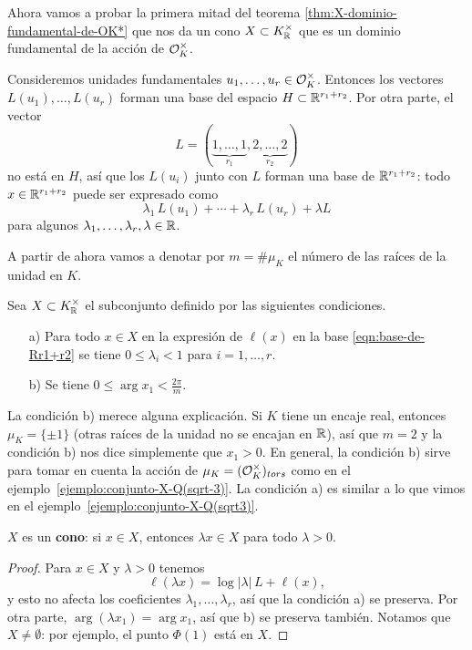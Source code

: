 Ahora vamos a probar la primera mitad del teorema
\ref{thm:X-dominio-fundamental-de-OK*} que nos da un cono
$X \subset K_{\mathbb{R}}^\times$ que es un dominio fundamental de la acción
de $\mathcal{O}_K^\times$.

Consideremos unidades fundamentales $u_1, \ldots, u_r \in \mathcal{O}_K^\times$. Entonces
los vectores $L (u_1), \ldots, L (u_r)$ forman una base del espacio $H \subset
\mathbb{R}^{r_1+r_2}$. Por otra parte, el vector
$$L = (\underbrace{1,\ldots,1}_{r_1}, \underbrace{2,\ldots,2}_{r_2})$$
no está en $H$, así que los $L (u_i)$ junto con $L$ forman una base de
$\mathbb{R}^{r_1+r_2}$: todo $x \in \mathbb{R}^{r_1+r_2}$ puede ser expresado como
\begin{equation}
  \label{eqn:base-de-Rr1+r2}
  \lambda_1 \, L (u_1) + \cdots + \lambda_r \, L (u_r) + \lambda L
\end{equation}
para algunos $\lambda_1,\ldots,\lambda_r,\lambda \in \mathbb{R}$.

A partir de ahora vamos a denotar por $m = \# \mu_K$ el número de las raíces de
la unidad en $K$.

\begin{definicion}
  Sea $X \subset K_{\mathbb{R}}^\times$ el subconjunto definido por las siguientes
  condiciones.
  \begin{enumerate}
  \item[a)] Para todo $x \in X$ en la expresión de $\ell (x)$ en la base
    \eqref{eqn:base-de-Rr1+r2} se tiene $0 \le \lambda_i < 1$ para
    $i = 1,\ldots,r$.

  \item[b)] Se tiene $0 \le \arg x_1 < \frac{2\pi}{m}$.
  \end{enumerate}
\end{definicion}

La condición b) merece alguna explicación. Si $K$ tiene un encaje real, entonces
$\mu_K = \{ \pm 1 \}$ (otras raíces de la unidad no se encajan en $\mathbb{R}$), así
que $m = 2$ y la condición b) nos dice simplemente que $x_1 > 0$. En general,
la condición b) sirve para tomar en cuenta la acción de
$\mu_K = (\mathcal{O}_K^\times)_{tors}$ como en
el ejemplo~\ref{ejemplo:conjunto-X-Q(sqrt-3)}. La condición a) es similar a
lo que vimos en el ejemplo~\ref{ejemplo:conjunto-X-Q(sqrt3)}.

\begin{proposicion}
  $X$ es un \textbf{cono}: si $x \in X$, entonces $\lambda x \in X$
  para todo $\lambda > 0$.

  \begin{proof}
    Para $x \in X$ y $\lambda > 0$ tenemos
    $$\ell (\lambda x) = \log |\lambda|\,L + \ell (x),$$
    y esto no afecta los coeficientes $\lambda_1,\ldots,\lambda_r$, así que la
    condición a) se preserva. Por otra parte, $\arg (\lambda x_1) = \arg x_1$,
    así que b) se preserva también. Notamos que $X \ne \emptyset$: por ejemplo,
    el punto $\Phi (1)$ está en $X$.
  \end{proof}
\end{proposicion}


